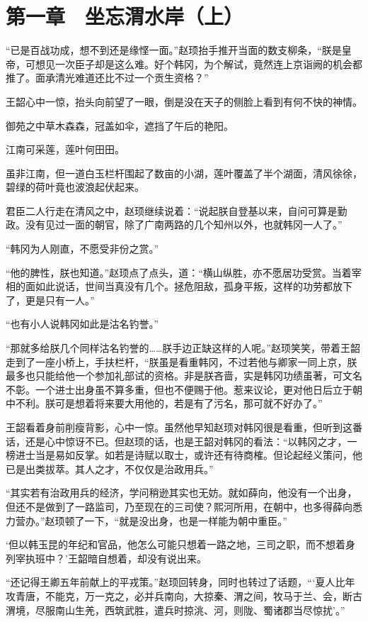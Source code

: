 \section{第一章　坐忘渭水岸（上）}

“已是百战功成，想不到还是缘悭一面。”赵顼抬手推开当面的数支柳条，“朕是皇帝，可想见一次臣子却是这么难。好个韩冈，为个解试，竟然连上京诣阙的机会都推了。面承清光难道还比不过一个贡生资格？”

王韶心中一惊，抬头向前望了一眼，倒是没在天子的侧脸上看到有何不快的神情。

御苑之中草木森森，冠盖如伞，遮挡了午后的艳阳。

江南可采莲，莲叶何田田。

虽非江南，但一道白玉栏杆围起了数亩的小湖，莲叶覆盖了半个湖面，清风徐徐，碧绿的荷叶竟也波浪起伏起来。

君臣二人行走在清风之中，赵顼继续说着：“说起朕自登基以来，自问可算是勤政。没有见过一面的朝官，除了广南两路的几个知州以外，也就韩冈一人了。”

“韩冈为人刚直，不愿受非份之赏。”

“他的脾性，朕也知道。”赵顼点了点头，道：“横山纵胜，亦不愿居功受赏。当着宰相的面如此说话，世间当真没有几个。拯危阻敌，孤身平叛，这样的功劳都放下了，更是只有一人。”

“也有小人说韩冈如此是沽名钓誉。”

“那就多给朕几个同样沽名钓誉的……朕手边正缺这样的人呢。”赵顼笑笑，带着王韶走到了一座小桥上，手扶栏杆，“朕虽是看重韩冈，不过若他与卿家一同上京，朕最多也只能给他一个参加礼部试的资格。非是朕吝啬，实是韩冈功绩虽著，可文名不彰。一个进士出身虽不算多重，但也不便赐于他。惹来议论，更对他日后立于朝中不利。朕可是想着将来要大用他的，若是有了污名，那可就不好办了。”

王韶看着身前削瘦背影，心中一惊。虽然他早知赵顼对韩冈很是看重，但听到这番话，还是心中惊讶不已。但赵顼的话，也是王韶对韩冈的看法：“以韩冈之才，一榜进士当是易如反掌。如若是诗赋以取士，或许还有待商榷。但论起经义策问，他已是出类拔萃。其人之才，不仅仅是治政用兵。”

“其实若有治政用兵的经济，学问稍逊其实也无妨。就如薛向，他没有一个出身，但还不是做到了一路监司，乃至现在的三司使？熙河所用，在朝中，也多得薛向悉力营办。”赵顼顿了一下，“就是没出身，也是一样能为朝中重臣。”

‘但以韩玉昆的年纪和官品，他怎么可能只想着一路之地，三司之职，而不想着身列宰执班中？’王韶暗自想着，却没有说出来。

“还记得王卿五年前献上的平戎策。”赵顼回转身，同时也转过了话题，“‘夏人比年攻青唐，不能克，万一克之，必并兵南向，大掠秦、渭之间，牧马于兰、会，断古渭境，尽服南山生羌，西筑武胜，遣兵时掠洮、河，则陇、蜀诸郡当尽惊扰’。”

